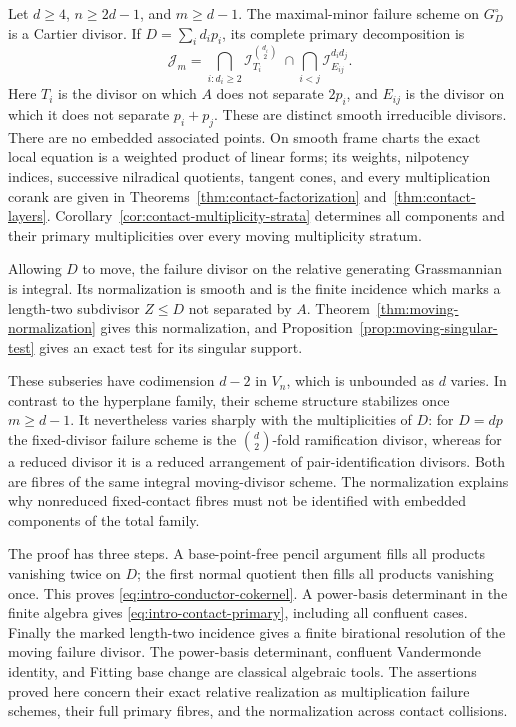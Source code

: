 \begin{theorem}\label{thm:contact-main}
Let $d\ge4$, $n\ge2d-1$, and $m\ge d-1$. The maximal-minor
failure scheme on $G_D^\circ$ is a Cartier divisor. If
$D=\sum_i d_i p_i$, its complete primary decomposition is
\begin{equation}\label{eq:intro-contact-primary}
 \mathcal J_m=
 \bigcap_{i:d_i\ge2}\mathcal I_{T_i}^{\binom{d_i}{2}}
 \ \cap\!
 \bigcap_{i<j}\mathcal I_{E_{ij}}^{d_i d_j}.
\end{equation}
Here $T_i$ is the divisor on which $A$ does not separate $2p_i$,
and $E_{ij}$ is the divisor on which it does not separate $p_i+p_j$.
These are distinct smooth irreducible divisors. There are no embedded
associated points. On smooth frame charts the exact local equation
is a weighted product of linear forms; its weights, nilpotency
indices, successive nilradical quotients, tangent cones, and every
multiplication corank are given in
Theorems~\ref{thm:contact-factorization} and~\ref{thm:contact-layers}.
Corollary~\ref{cor:contact-multiplicity-strata} determines all
components and their primary multiplicities over every moving
multiplicity stratum.

Allowing $D$ to move, the failure divisor on the relative generating
Grassmannian is integral. Its normalization is smooth and is the
finite incidence which marks a length-two subdivisor $Z\le D$
not separated by $A$. Theorem~\ref{thm:moving-normalization} gives
this normalization, and Proposition~\ref{prop:moving-singular-test}
gives an exact test for its singular support.
\end{theorem}

These subseries have codimension $d-2$ in $V_n$, which is unbounded
as $d$ varies. In contrast to the hyperplane family, their
scheme structure stabilizes once $m\ge d-1$. It nevertheless
varies sharply with the multiplicities of $D$: for $D=dp$ the
fixed-divisor failure scheme is the $\binom d2$-fold ramification
divisor, whereas for a reduced divisor it is a reduced arrangement
of pair-identification divisors. Both are fibres of the same
integral moving-divisor scheme. The normalization explains why
nonreduced fixed-contact fibres must not be identified with embedded
components of the total family.

The proof has three steps. A base-point-free pencil argument fills
all products vanishing twice on $D$; the first normal quotient then
fills all products vanishing once. This proves
\eqref{eq:intro-conductor-cokernel}. A power-basis determinant in the
finite algebra gives \eqref{eq:intro-contact-primary}, including
all confluent cases. Finally the marked length-two incidence gives
a finite birational resolution of the moving failure divisor.
The power-basis determinant, confluent Vandermonde identity, and
Fitting base change are classical algebraic tools. The assertions
proved here concern their exact relative realization as
multiplication failure schemes, their full primary fibres, and the
normalization across contact collisions.

